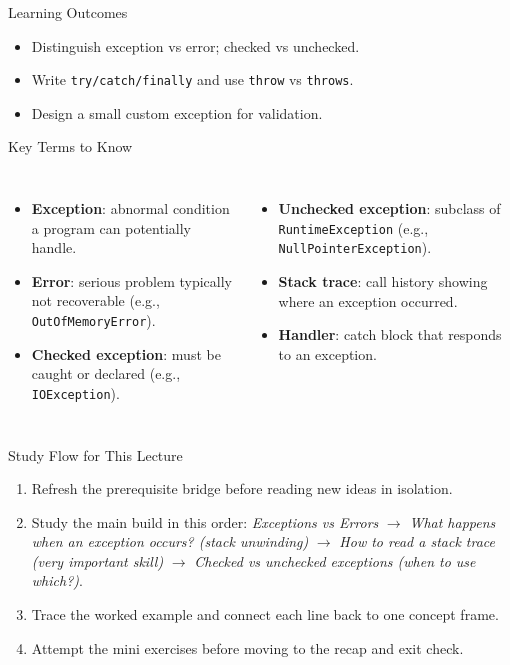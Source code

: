 \documentclass{beamer}
\begin{document}
\begin{frame}{Learning Outcomes}
  \begin{itemize}[<+->]
    \item Distinguish exception vs error; checked vs unchecked.
    \item Write \texttt{try/catch/finally} and use \texttt{throw} vs \texttt{throws}.
    \item Design a small custom exception for validation.
  \end{itemize}
  \slidesources{\OOPSUnitIIISources}
\end{frame}

\begin{frame}{Key Terms to Know}
\small
\begin{columns}[t]
\begin{itemize}
  \item \textbf{Exception}: abnormal condition a program can potentially handle.
  \item \textbf{Error}: serious problem typically not recoverable (e.g., \texttt{OutOfMemoryError}).
  \item \textbf{Checked exception}: must be caught or declared (e.g., \texttt{IOException}).
\end{itemize}
\begin{itemize}
  \item \textbf{Unchecked exception}: subclass of \texttt{RuntimeException} (e.g., \texttt{NullPointerException}).
  \item \textbf{Stack trace}: call history showing where an exception occurred.
  \item \textbf{Handler}: catch block that responds to an exception.
\end{itemize}
\end{columns}
  \slidesources{\OOPSUnitIIISources}
\end{frame}

\begin{frame}{Study Flow for This Lecture}
\begin{enumerate}[<+->]
  \item Refresh the prerequisite bridge before reading new ideas in isolation.
  \item Study the main build in this order: \textit{Exceptions vs Errors} $\rightarrow$ \textit{What happens when an exception occurs? (stack unwinding)} $\rightarrow$ \textit{How to read a stack trace (very important skill)} $\rightarrow$ \textit{Checked vs unchecked exceptions (when to use which?)}.
  \item Trace the worked example and connect each line back to one concept frame.
  \item Attempt the mini exercises before moving to the recap and exit check.
\end{enumerate}
  \slidesources{\OOPSUnitIIISources}
\end{frame}
\end{document}
